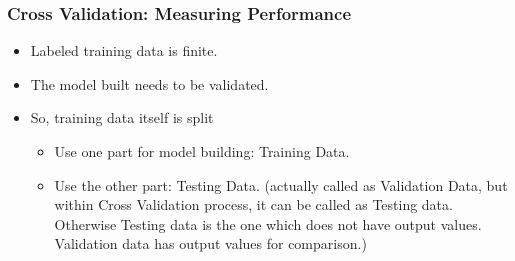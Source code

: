 \begin{frame}[fragile]\frametitle{Cross Validation: Measuring Performance}
\begin{itemize}
	\item Labeled training data is finite.
	\item The model built needs to be validated. 
	\item So, training data itself is split 
	\begin{itemize}
		\item Use one part for model building: Training Data.
		\item Use the other part: Testing Data. (actually called as Validation Data, but within Cross Validation process, it can be called as Testing data. Otherwise Testing data is the one which does not have output values. Validation data has output values for comparison.)
	\end{itemize}

\end{itemize}
\end{frame}







